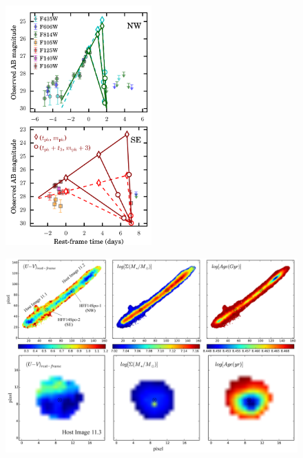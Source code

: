 \begin{figure}[tbp]
  \begin{center}
    \includegraphics[width=0.5\textwidth]{light_curve_linear_fits}
    \caption{\protect}
  \end{center}
\end{figure}

\begin{figure}[tbp]
  \begin{center}
    \includegraphics[width=\textwidth]{spock_hostgalaxy_properties.png}
    \caption{\protect}
  \end{center}
\end{figure}


